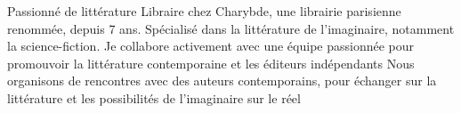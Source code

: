 

\begin{cvskills}


  \cvskill
    {Passionné de littérature} %
    {Libraire chez Charybde, une librairie parisienne renommée, depuis 7 ans. \newline Spécialisé dans la littérature de l'imaginaire, notamment la science-fiction. \newline Je  collabore activement avec une équipe passionnée   \newline pour promouvoir la littérature contemporaine et les éditeurs indépendants \newline Nous organisons de rencontres avec des auteurs contemporains, pour échanger \newline sur la littérature et les possibilités de l'imaginaire sur le réel} %

\end{cvskills}

